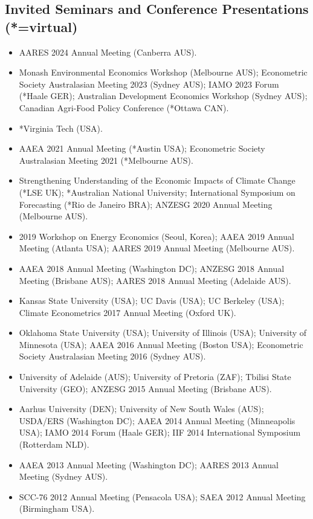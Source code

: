 \documentclass[10pt]{article}
\begin{document}
	\subsection*{Invited Seminars and Conference Presentations (*=virtual)}
	\begin{itemize}
		\item {} AARES 2024 Annual Meeting (Canberra AUS). %
		\item {} Monash Environmental Economics Workshop (Melbourne AUS); Econometric Society Australasian Meeting 2023 (Sydney AUS); IAMO 2023 Forum (*Haale GER); Australian Development Economics Workshop (Sydney AUS); Canadian Agri-Food Policy Conference (*Ottawa CAN).
		\item {} *Virginia Tech (USA).
		\item {} AAEA 2021 Annual Meeting (*Austin USA); Econometric Society Australasian Meeting 2021 (*Melbourne AUS).
		\item {} Strengthening Understanding of the Economic Impacts of Climate Change (*LSE UK); *Australian National University; International Symposium on Forecasting (*Rio de Janeiro BRA); ANZESG 2020 Annual Meeting (Melbourne AUS).
		\item {} 2019 Workshop on Energy Economics (Seoul, Korea); AAEA 2019 Annual Meeting (Atlanta USA); AARES 2019 Annual Meeting (Melbourne AUS).
		\item {} AAEA 2018 Annual Meeting (Washington DC); ANZESG 2018 Annual Meeting (Brisbane AUS); AARES 2018 Annual Meeting (Adelaide AUS).
		\item {} Kansas State University (USA); UC Davis (USA); UC Berkeley (USA); Climate Econometrics 2017 Annual Meeting (Oxford UK).
		\item {} Oklahoma State University (USA); University of Illinois (USA); University of Minnesota (USA); AAEA 2016 Annual Meeting (Boston USA); Econometric Society Australasian Meeting 2016 (Sydney AUS).
		\item {} University of Adelaide (AUS); University of Pretoria (ZAF); Tbilisi State University (GEO); ANZESG 2015 Annual Meeting (Brisbane AUS).
		\item {} Aarhus University (DEN); University of New South Wales (AUS); USDA/ERS (Washington DC); AAEA 2014 Annual Meeting (Minneapolis USA); IAMO 2014 Forum (Haale GER); IIF 2014 International Symposium (Rotterdam NLD).
		\item {} AAEA 2013 Annual Meeting (Washington DC); AARES 2013 Annual Meeting (Sydney AUS).
		\item {} SCC-76 2012 Annual Meeting (Pensacola USA); SAEA 2012 Annual Meeting (Birmingham USA).
	\end{itemize}
	
\end{document}
